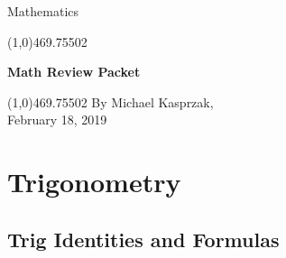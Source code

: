 \documentclass[12pt]{article}
\numberwithin{equation}{subsection}
\begin{document}
\begin{titlepage}
\begin{center}
\begin{Large}
Mathematics\\
\end{Large}
\vfill
\line(1,0){469.75502}\\[1mm]
\begin{Large}
\textbf{Math Review Packet}
\end{Large}
\line(1,0){469.75502}
\vfill
By Michael Kasprzak,\\
February 18, 2019
\end{center}
\end{titlepage}




\tableofcontents
\cleardoublepage


\newpage
{}
\setcounter{page}{1}
\section{Trigonometry}
\subsection{Trig Identities and Formulas}
\end{document}

